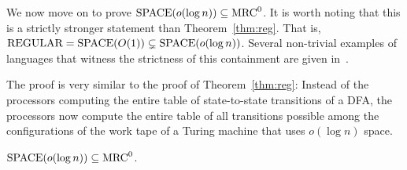 \documentclass{llncs}
\newcommand{\mrc}{\textup{MRC}}
\newcommand{\SPACE}{\textup{SPACE}}
\begin{document}
We now move on to prove $\SPACE(o(\log n))\subseteq \mrc^0$. It is worth noting
that this is a strictly stronger statement than Theorem~\ref{thm:reg}. That
is, $\textup{REGULAR}=\SPACE(O(1))\subsetneq \SPACE(o(\log n))$. Several
non-trivial examples of languages that witness the strictness of this
containment are given in~\cite{szepietowski1994turing}.

The proof is very similar to the proof of Theorem~\ref{thm:reg}:  Instead of
the processors computing the entire table of state-to-state transitions of a
DFA, the processors now compute the entire table of all transitions possible
among the configurations of the work tape of a Turing machine that uses $o(\log
n)$ space. 

\begin{theorem} \label{thm:sublogspace}
$\textup{SPACE}(o(\log n))\subseteq \mrc^0$.
\end{theorem}
\end{document}
